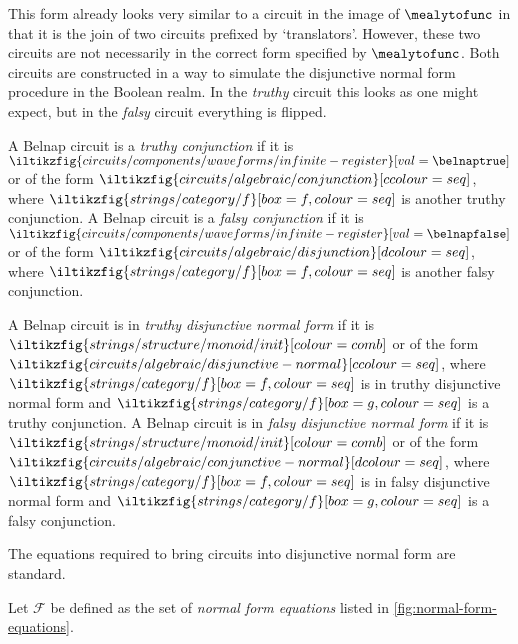 This form already looks very similar to a circuit in the image of
\(\mealytofunc\) in that it is the join of two circuits prefixed by
`translators'.
However, these two circuits are not necessarily in the correct form specified by
\(\mealytofunc\).
Both circuits are constructed in a way to simulate the disjunctive normal form
procedure in the Boolean realm.
In the \emph{truthy} circuit this looks as one might expect, but in the
\emph{falsy} circuit everything is flipped.

\begin{definition}[Conjunction]
    A Belnap circuit is a \emph{truthy conjunction} if it is \(
    \iltikzfig{circuits/components/waveforms/infinite-register}[val=\belnaptrue]
    \) or of the form \(
    \iltikzfig{circuits/algebraic/conjunction}[ccolour=seq]
    \), where \(
    \iltikzfig{strings/category/f}[box=f, colour=seq]
    \) is another truthy conjunction.
    A Belnap circuit is a \emph{falsy conjunction} if it is \(
    \iltikzfig{circuits/components/waveforms/infinite-register}[val=\belnapfalse]
    \) or of the form \(
    \iltikzfig{circuits/algebraic/disjunction}[dcolour=seq]
    \), where \(
    \iltikzfig{strings/category/f}[box=f, colour=seq]
    \) is another falsy conjunction.
\end{definition}

\begin{definition}
    A Belnap circuit is in \emph{truthy disjunctive normal form} if it is \(
    \iltikzfig{strings/structure/monoid/init}[colour=comb]
    \) or of the form \(
    \iltikzfig{circuits/algebraic/disjunctive-normal}[ccolour=seq]
    \), where \(
    \iltikzfig{strings/category/f}[box=f, colour=seq]
    \) is in truthy disjunctive normal form and \(
    \iltikzfig{strings/category/f}[box=g, colour=seq]
    \) is a truthy conjunction.
    A Belnap circuit is in \emph{falsy disjunctive normal form} if it is \(
    \iltikzfig{strings/structure/monoid/init}[colour=comb]
    \) or of the form \(
    \iltikzfig{circuits/algebraic/conjunctive-normal}[dcolour=seq]
    \), where \(
    \iltikzfig{strings/category/f}[box=f, colour=seq]
    \) is in falsy disjunctive normal form and \(
    \iltikzfig{strings/category/f}[box=g, colour=seq]
    \) is a falsy conjunction.
\end{definition}

The equations required to bring circuits into disjunctive normal
form are standard.

\begin{definition}
    Let \(\mathcal{F}\) be defined as the set of \emph{normal form equations}
    listed in \cref{fig:normal-form-equations}.
\end{definition}

